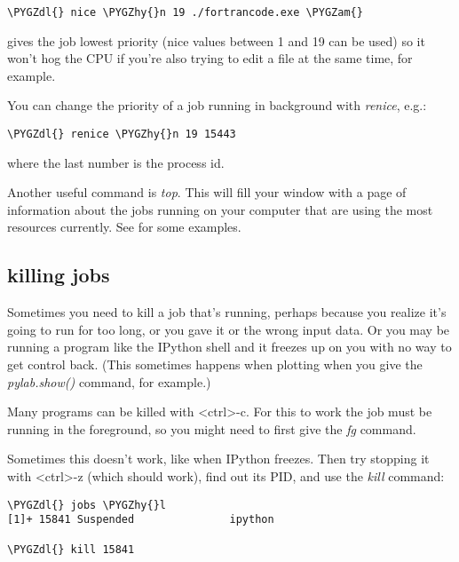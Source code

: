 \documentclass[letterpaper,10pt,english]{sphinxmanual}
\def\PYGZam{\char`\&}
\def\PYGZdl{\char`\$}
\def\PYGZhy{\char`\-}
\begin{document}
\begin{Verbatim}[commandchars=\\\{\}]
\PYGZdl{} nice \PYGZhy{}n 19 ./fortrancode.exe \PYGZam{}
\end{Verbatim}

gives the job lowest priority (nice values between 1 and 19 can be used) so
it won't hog the CPU if you're also trying to edit a file at the same time,
for example.

You can change the priority of a job running in background with \emph{renice},
e.g.:

\begin{Verbatim}[commandchars=\\\{\}]
\PYGZdl{} renice \PYGZhy{}n 19 15443
\end{Verbatim}

where the last number is the process id.

Another useful command is \emph{top}.  This will fill your window with a page of
information about the jobs running on your computer that are using the most
resources currently.  See {\hyperref[top:topcommand]{}} for some examples.


\subsection{killing jobs}
\label{unix:killing-jobs}\label{unix:kill}
Sometimes you need to kill a job that's running, perhaps because you realize
it's going to run for too long, or you gave it or the wrong input data.  Or
you may be running a program like the IPython shell and it freezes up on you
with no way to get control back.  (This sometimes happens when plotting when
you give the \emph{pylab.show()} command, for example.)

Many programs can be killed with \textless{}ctrl\textgreater{}-c.  For this to work the job must be
running in the foreground, so you might need to first give the \emph{fg} command.

Sometimes this doesn't work, like when IPython freezes.  Then try stopping
it with \textless{}ctrl\textgreater{}-z (which should work), find out its PID, and use the \emph{kill}
command:

\begin{Verbatim}[commandchars=\\\{\}]
\PYGZdl{} jobs \PYGZhy{}l
[1]+ 15841 Suspended               ipython

\PYGZdl{} kill 15841
\end{Verbatim}
\end{document}
